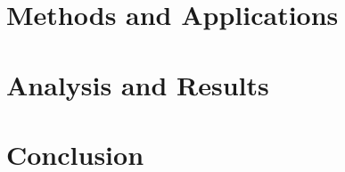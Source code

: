 \documentclass[12pt,a4paper]{report}
\begin{document}
\vspace{4em}

\chapter*{Methods and Applications}

\vspace{4em}

\chapter*{Analysis and Results}

\vspace{4em}

\chapter*{Conclusion}
\newpage
\printbibliography[heading=bibintoc,title={REFERENCES}]
\end{document}
